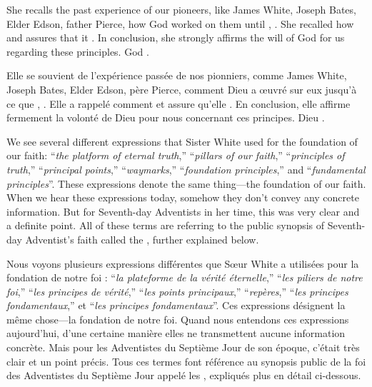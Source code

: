 She recalls the past experience of our pioneers, like James White, Joseph Bates, Elder Edson, father Pierce, how God worked on them until , . She recalled how  and assures that it . In conclusion, she strongly affirms the will of God for us regarding these principles. God .


Elle se souvient de l'expérience passée de nos pionniers, comme James White, Joseph Bates, Elder Edson, père Pierce, comment Dieu a œuvré sur eux jusqu'à ce que , . Elle a rappelé comment  et assure qu'elle . En conclusion, elle affirme fermement la volonté de Dieu pour nous concernant ces principes. Dieu .


We see several different expressions that Sister White used for the foundation of our faith: “\textit{the platform of eternal truth},” “\textit{pillars of our faith},” “\textit{principles of truth},” “\textit{principal points},” “\textit{waymarks},” “\textit{foundation principles},” and “\textit{fundamental principles}”. These expressions denote the same thing—the foundation of our faith. When we hear these expressions today, somehow they don’t convey any concrete information. But for Seventh-day Adventists in her time, this was very clear and a definite point. All of these terms are referring to the public synopsis of Seventh-day Adventist’s faith called the , further explained below.


Nous voyons plusieurs expressions différentes que Sœur White a utilisées pour la fondation de notre foi : “\textit{la plateforme de la vérité éternelle},” “\textit{les piliers de notre foi},” “\textit{les principes de vérité},” “\textit{les points principaux},” “\textit{repères},” “\textit{les principes fondamentaux},” et “\textit{les principes fondamentaux}”. Ces expressions désignent la même chose—la fondation de notre foi. Quand nous entendons ces expressions aujourd'hui, d'une certaine manière elles ne transmettent aucune information concrète. Mais pour les Adventistes du Septième Jour de son époque, c'était très clair et un point précis. Tous ces termes font référence au synopsis public de la foi des Adventistes du Septième Jour appelé les , expliqués plus en détail ci-dessous.


